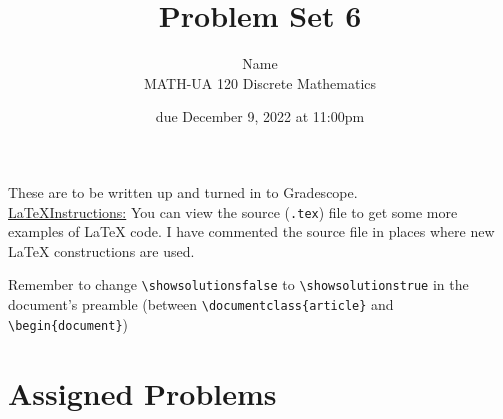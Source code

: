 \documentclass{article}
\title{Problem Set 6}
\author{%
    Name
\\  MATH-UA 120 Discrete Mathematics
}
\date{due December 9, 2022 at 11:00pm}
\newif\ifshowsolutions
\newcommand{\danger}{\marginpar[\hfill\dbend]{\dbend\hfill}}
\theoremstyle{definition}
\begin{document}
\maketitle



These are to be written up and turned in to Gradescope.\\



\ifshowsolutions
    \SetupExSheets{solution/print=true}
\else
    \danger
 \underline{ \LaTeX  Instructions:}  You can view the source (\texttt{.tex}) file to get some more examples of \LaTeX{} code.  I have commented the source file in places where new \LaTeX{} constructions are used.
  
  Remember to change \verb|\showsolutionsfalse| to \verb|\showsolutionstrue|
    in the document's preamble 
    (between \verb|\documentclass{article}| and \verb|\begin{document}|)
\fi

\section*{Assigned Problems}
\end{document}

